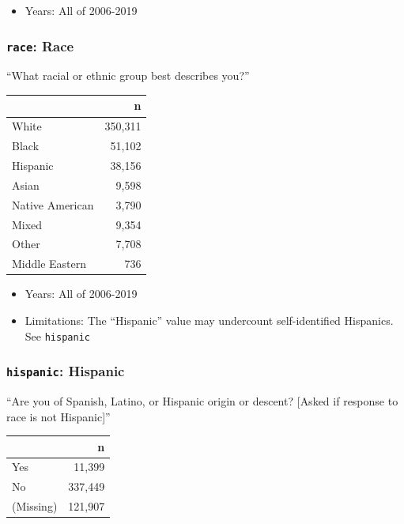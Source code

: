 \documentclass[10pt,article,oneside]{memoir}
\theoremstyle{definition}
\begin{document}
\begin{itemize}
\tightlist
\item
  Years: All of 2006-2019
\end{itemize}

\hypertarget{race-race}{%
\subsubsection{\texorpdfstring{\texttt{race}:
Race}{race: Race}}\label{race-race}}

``What racial or ethnic group best describes you?''

\begin{table}[H]
\centering
\begin{tabular}{lr}
\toprule
 & n\\
\midrule
White & 350,311\\
Black & 51,102\\
Hispanic & 38,156\\
Asian & 9,598\\
Native American & 3,790\\
Mixed & 9,354\\
Other & 7,708\\
Middle Eastern & 736\\
\bottomrule
\end{tabular}
\end{table}

\begin{itemize}
\tightlist
\item
  Years: All of 2006-2019
\item
  Limitations: The ``Hispanic'' value may undercount self-identified
  Hispanics. See \texttt{hispanic}
\end{itemize}

\hypertarget{hispanic-hispanic}{%
\subsubsection{\texorpdfstring{\texttt{hispanic}:
Hispanic}{hispanic: Hispanic}}\label{hispanic-hispanic}}

``Are you of Spanish, Latino, or Hispanic origin or descent? {[}Asked if
response to race is not Hispanic{]}''

\begin{table}[H]
\centering
\begin{tabular}{lr}
\toprule
 & n\\
\midrule
Yes & 11,399\\
No & 337,449\\
(Missing) & 121,907\\
\bottomrule
\end{tabular}
\end{table}
\end{document}
